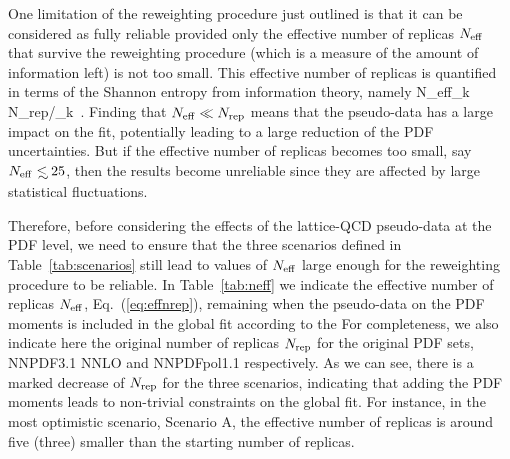 One limitation of the reweighting procedure just
outlined is that it can be considered as fully 
 reliable provided only the 
  effective number of replicas $N_{\rm eff}$ that survive the reweighting
  procedure (which is a measure of the amount
  of information left) is not too small.
  This effective number of replicas
    is quantified in terms of the Shannon entropy from information
    theory, namely
    \be
    \label{eq:effnrep}
    N_{\rm eff}\equiv \exp\lc {}\omega_k
    \log \lp N_{\rm rep}/\omega_k\rp\rc \, .
    \ee
    Finding that $N_{\rm eff}\ll N_{\rm rep}$ means that the pseudo-data
    has a large impact on the fit, potentially leading to a large
    reduction of the PDF uncertainties.
    But if the effective number of replicas becomes too
    small, say $N_{\rm eff}\lsim 25$, then the results
    become unreliable since they are affected by large
    statistical fluctuations.

    Therefore, before considering the effects
    of the lattice-QCD pseudo-data at the PDF
    level, we need to ensure that the
    three scenarios defined
    in Table~\ref{tab:scenarios} still lead
    to values of $N_{\rm eff}$ large enough for
    the reweighting procedure to be reliable.
In Table~\ref{tab:neff} we indicate the effective number of replicas
    $N_{\rm eff}$, Eq.~(\ref{eq:effnrep}), remaining when the pseudo-data
    on the PDF moments is included in the global
    fit according to the 
    For completeness, we also indicate here the original number
    of replicas $N_{\rm rep}$ for the original
    PDF sets, NNPDF3.1 NNLO and NNPDFpol1.1 respectively.
    As we can see, there is a marked decrease of $N_{\rm rep}$
    for the three scenarios, indicating that adding the
    PDF moments leads to non-trivial constraints on the global
    fit.
    For instance, in the most optimistic scenario,
    Scenario A, the effective number of replicas is around five (three)
    smaller than the starting number of replicas.

